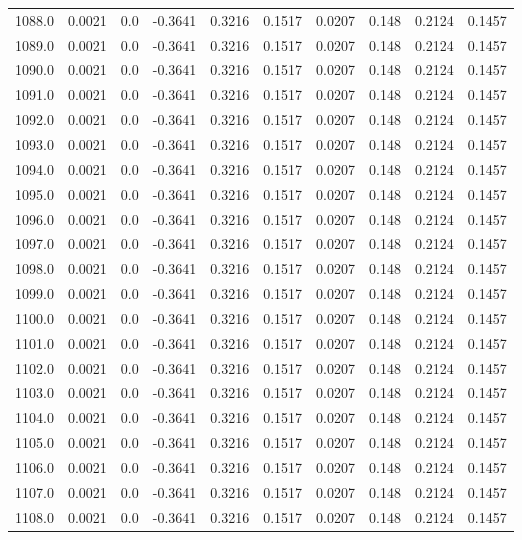 \begin{longtable}{lrrrrrrrrr}
1088.0 & 0.0021 & 0.0 & -0.3641 & 0.3216 & 0.1517 & 0.0207 & 0.148 & 0.2124 & 0.1457 \\
1089.0 & 0.0021 & 0.0 & -0.3641 & 0.3216 & 0.1517 & 0.0207 & 0.148 & 0.2124 & 0.1457 \\
1090.0 & 0.0021 & 0.0 & -0.3641 & 0.3216 & 0.1517 & 0.0207 & 0.148 & 0.2124 & 0.1457 \\
1091.0 & 0.0021 & 0.0 & -0.3641 & 0.3216 & 0.1517 & 0.0207 & 0.148 & 0.2124 & 0.1457 \\
1092.0 & 0.0021 & 0.0 & -0.3641 & 0.3216 & 0.1517 & 0.0207 & 0.148 & 0.2124 & 0.1457 \\
1093.0 & 0.0021 & 0.0 & -0.3641 & 0.3216 & 0.1517 & 0.0207 & 0.148 & 0.2124 & 0.1457 \\
1094.0 & 0.0021 & 0.0 & -0.3641 & 0.3216 & 0.1517 & 0.0207 & 0.148 & 0.2124 & 0.1457 \\
1095.0 & 0.0021 & 0.0 & -0.3641 & 0.3216 & 0.1517 & 0.0207 & 0.148 & 0.2124 & 0.1457 \\
1096.0 & 0.0021 & 0.0 & -0.3641 & 0.3216 & 0.1517 & 0.0207 & 0.148 & 0.2124 & 0.1457 \\
1097.0 & 0.0021 & 0.0 & -0.3641 & 0.3216 & 0.1517 & 0.0207 & 0.148 & 0.2124 & 0.1457 \\
1098.0 & 0.0021 & 0.0 & -0.3641 & 0.3216 & 0.1517 & 0.0207 & 0.148 & 0.2124 & 0.1457 \\
1099.0 & 0.0021 & 0.0 & -0.3641 & 0.3216 & 0.1517 & 0.0207 & 0.148 & 0.2124 & 0.1457 \\
1100.0 & 0.0021 & 0.0 & -0.3641 & 0.3216 & 0.1517 & 0.0207 & 0.148 & 0.2124 & 0.1457 \\
1101.0 & 0.0021 & 0.0 & -0.3641 & 0.3216 & 0.1517 & 0.0207 & 0.148 & 0.2124 & 0.1457 \\
1102.0 & 0.0021 & 0.0 & -0.3641 & 0.3216 & 0.1517 & 0.0207 & 0.148 & 0.2124 & 0.1457 \\
1103.0 & 0.0021 & 0.0 & -0.3641 & 0.3216 & 0.1517 & 0.0207 & 0.148 & 0.2124 & 0.1457 \\
1104.0 & 0.0021 & 0.0 & -0.3641 & 0.3216 & 0.1517 & 0.0207 & 0.148 & 0.2124 & 0.1457 \\
1105.0 & 0.0021 & 0.0 & -0.3641 & 0.3216 & 0.1517 & 0.0207 & 0.148 & 0.2124 & 0.1457 \\
1106.0 & 0.0021 & 0.0 & -0.3641 & 0.3216 & 0.1517 & 0.0207 & 0.148 & 0.2124 & 0.1457 \\
1107.0 & 0.0021 & 0.0 & -0.3641 & 0.3216 & 0.1517 & 0.0207 & 0.148 & 0.2124 & 0.1457 \\
1108.0 & 0.0021 & 0.0 & -0.3641 & 0.3216 & 0.1517 & 0.0207 & 0.148 & 0.2124 & 0.1457 \\

\end{longtable}
